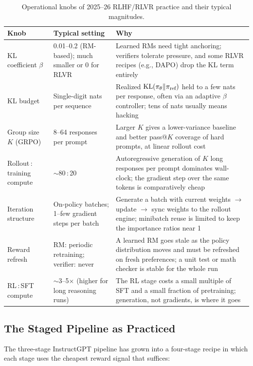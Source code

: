 \begin{table}[H]
\centering
\small
\begin{tabularx}{\textwidth}{@{}l l X@{}}
\toprule
\textbf{Knob} & \textbf{Typical setting} & \textbf{Why} \\
\midrule
KL coefficient $\beta$ & 0.01--0.2 (RM-based); much smaller or 0 for RLVR &
  Learned RMs need tight anchoring; verifiers tolerate pressure, and some
  RLVR recipes (e.g., DAPO) drop the KL term entirely \\
KL budget & Single-digit nats per sequence &
  Realized $\operatorname{KL}(\pi_\theta \| \pi_{\text{ref}})$ held to a few nats per
  response, often via an adaptive $\beta$ controller; tens of nats
  usually means hacking \\
Group size $K$ (GRPO) & 8--64 responses per prompt &
  Larger $K$ gives a lower-variance baseline and better pass@$K$
  coverage of hard prompts, at linear rollout cost \\
Rollout\,:\,training compute & $\sim$80\,:\,20 &
  Autoregressive generation of $K$ long responses per prompt dominates
  wall-clock; the gradient step over the same tokens is comparatively
  cheap \\
Iteration structure & On-policy batches; 1--few gradient steps per batch &
  Generate a batch with current weights $\to$ update $\to$ sync weights
  to the rollout engine; minibatch reuse is limited to keep the
  importance ratios near 1 \\
Reward refresh & RM: periodic retraining; verifier: never &
  A learned RM goes stale as the policy distribution moves and must be
  refreshed on fresh preferences; a unit test or math checker is stable
  for the whole run \\
RL\,:\,SFT compute & $\sim$3--5$\times$ (higher for long reasoning runs) &
  The RL stage costs a small multiple of SFT and a small fraction of
  pretraining; generation, not gradients, is where it goes \\
\bottomrule
\end{tabularx}
\caption{Operational knobs of 2025--26 RLHF/RLVR practice and their
typical magnitudes.}
\label{tab:rlvr_knobs}
\end{table}

\subsection{The Staged Pipeline as Practiced}
\label{sec:staged_pipeline}

The three-stage InstructGPT pipeline has grown into a four-stage recipe in
which each stage uses the cheapest reward signal that suffices:

